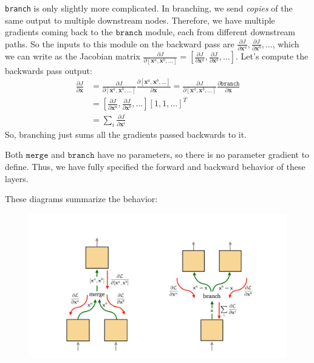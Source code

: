 \texttt{branch} is only slightly more complicated. In branching, we send \textit{copies} of the same output to multiple downstream nodes. Therefore, we have multiple gradients coming back to the $\texttt{branch}$ module, each from different downstream paths. So the inputs to this module on the backward pass are $\frac{\partial J}{\partial \mathbf{x}^{a}}, \frac{\partial J}{\partial \mathbf{x}^{b}}, \ldots$, which we can write as the Jacobian matrix $\frac{\partial J}{\partial [\mathbf{x}^a, \mathbf{x}^b, \ldots]} = [\frac{\partial J}{\partial \mathbf{x}^{a}}, \frac{\partial J}{\partial \mathbf{x}^{b}}, \ldots]$.  Let's compute the backwards pass output:
\begin{align}
    \frac{\partial J}{\partial \mathbf{x}} &= \frac{\partial J}{\partial [\mathbf{x}^a, \mathbf{x}^b, \ldots]} \frac{\partial [\mathbf{x}^a, \mathbf{x}^b, \ldots]}{\partial \mathbf{x}} = \frac{\partial J}{\partial [\mathbf{x}^a, \mathbf{x}^b, \ldots]} \frac{\partial \texttt{branch}}{\partial \mathbf{x}}\\
    &= [\frac{\partial J}{\partial \mathbf{x}^{a}}, \frac{\partial J}{\partial \mathbf{x}^{b}}, \ldots][1, 1, \ldots]^T\\
    &= \sum_{i} \frac{\partial J}{\partial \mathbf{x}^{i}}
\end{align}
So, branching just sums all the gradients passed backwards to it.

Both $\texttt{merge}$ and $\texttt{branch}$ have no parameters, so there is no parameter gradient to define. Thus, we have fully specified the forward and backward behavior of these layers. 

These diagrams summarize the behavior:
\begin{figure}[h]
    \centering
    \includegraphics[width=0.75\linewidth]{./figures/backpropagation/branch_merge_gradient_diagrams.pdf}
    \label{fig:backprop_branch_merge_gradient_diagrams}
\end{figure}


